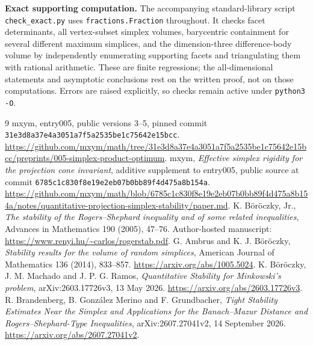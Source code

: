 \documentclass[11pt]{article}
\begin{document}
\medskip\noindent\textbf{Exact supporting computation.}
The accompanying standard-library script \texttt{check\_exact.py} uses
\texttt{fractions.Fraction} throughout. It checks facet determinants,
all vertex-subset simplex volumes, barycentric containment for several
different maximum simplices, and the dimension-three difference-body
volume by independently enumerating supporting facets and triangulating
them with rational arithmetic. These are finite regressions; the
all-dimensional statements and asymptotic conclusions rest on the written
proof, not on those computations. Errors are raised explicitly, so checks
remain active under \texttt{python3 -O}.

\begin{thebibliography}{9}
mxym, entry005, public versions 3--5, pinned commit
\nolinkurl{31e3d8a37e4a3051a7f5a2535be1c75642e15bcc}.
\url{https://github.com/mxym/math/tree/31e3d8a37e4a3051a7f5a2535be1c75642e15bcc/preprints/005-simplex-product-optimum}.
mxym, \emph{Effective simplex rigidity for the projection cone invariant},
additive supplement to entry005, public source at commit
\nolinkurl{6785c1c830f8e19e2eb07b0bb89f4d475a8b154a}.
\url{https://github.com/mxym/math/blob/6785c1c830f8e19e2eb07b0bb89f4d475a8b154a/notes/quantitative-projection-simplex-stability/paper.md}.
K. B\"or\"oczky, Jr., \emph{The stability of the Rogers--Shephard inequality
and of some related inequalities}, Advances in Mathematics 190 (2005),
47--76. Author-hosted manuscript:
\url{https://www.renyi.hu/~carlos/rogerstab.pdf}.
G. Ambrus and K. J. B\"or\"oczky, \emph{Stability results for the volume
of random simplices}, American Journal of Mathematics 136 (2014), 833--857.
\url{https://arxiv.org/abs/1005.5024}.
K. B\"or\"oczky, J. M. Machado and J. P. G. Ramos,
\emph{Quantitative Stability for Minkowski's problem}, arXiv:2603.17726v3,
13 May 2026. \url{https://arxiv.org/abs/2603.17726v3}.
R. Brandenberg, B. Gonz\'alez Merino and F. Grundbacher,
\emph{Tight Stability Estimates Near the Simplex and Applications for
the Banach--Mazur Distance and Rogers--Shephard-Type Inequalities},
arXiv:2607.27041v2, 14 September 2026.
\url{https://arxiv.org/abs/2607.27041v2}.
\end{thebibliography}
\end{document}
